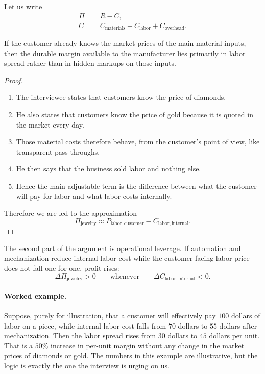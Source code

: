 Let us write
\begin{align}
\Pi &= R - C,\\
C &= C_{\mathrm{materials}} + C_{\mathrm{labor}} + C_{\mathrm{overhead}}.
\end{align}

\begin{proposition}
If the customer already knows the market prices of the main material inputs, then the durable margin available to the manufacturer lies primarily in labor spread rather than in hidden markups on those inputs.
\end{proposition}

\begin{proof}
\begin{enumerate}
\item The interviewee states that customers know the price of diamonds.
\item He also states that customers know the price of gold because it is quoted in the market every day.
\item Those material costs therefore behave, from the customer's point of view, like transparent pass-throughs.
\item He then says that the business sold labor and nothing else.
\item Hence the main adjustable term is the difference between what the customer will pay for labor and what labor costs internally.
\end{enumerate}
Therefore we are led to the approximation
\begin{equation}
\Pi_{\mathrm{jewelry}} \approx P_{\mathrm{labor,customer}} - C_{\mathrm{labor,internal}}.
\end{equation}
\end{proof}

The second part of the argument is operational leverage. If automation and mechanization reduce internal labor cost while the customer-facing labor price does not fall one-for-one, profit rises:
\begin{equation}
\Delta \Pi_{\mathrm{jewelry}} > 0 \qquad \text{whenever} \qquad \Delta C_{\mathrm{labor,internal}} < 0.
\end{equation}

\paragraph{Worked example.} Suppose, purely for illustration, that a customer will effectively pay \(100\) dollars of labor on a piece, while internal labor cost falls from \(70\) dollars to \(55\) dollars after mechanization. Then the labor spread rises from \(30\) dollars to \(45\) dollars per unit. That is a \(50\%\) increase in per-unit margin without any change in the market prices of diamonds or gold. The numbers in this example are illustrative, but the logic is exactly the one the interview is urging on us.

